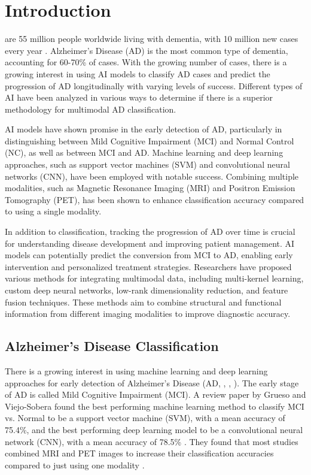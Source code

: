 \section{Introduction}
\label{sec:introduction}
 are 55 million people worldwide living with dementia, with 10 million new cases every year \cite{who_dementia_nodate}. Alzheimer's Disease (AD) is the most common type of dementia, accounting for 60-70\% of cases. With the growing number of cases, there is a growing interest in using AI models to classify AD cases and predict the progression of AD longitudinally with varying levels of success. Different types of AI have been analyzed in various ways to determine if there is a superior methodology for multimodal AD classification.

AI models have shown promise in the early detection of AD, particularly in distinguishing between Mild Cognitive Impairment (MCI) and Normal Control (NC), as well as between MCI and AD. Machine learning and deep learning approaches, such as support vector machines (SVM) and convolutional neural networks (CNN), have been employed with notable success. Combining multiple modalities, such as Magnetic Resonance Imaging (MRI) and Positron Emission Tomography (PET), has been shown to enhance classification accuracy compared to using a single modality.

In addition to classification, tracking the progression of AD over time is crucial for understanding disease development and improving patient management. AI models can potentially predict the conversion from MCI to AD, enabling early intervention and personalized treatment strategies. Researchers have proposed various methods for integrating multimodal data, including multi-kernel learning, custom deep neural networks, low-rank dimensionality reduction, and feature fusion techniques. These methods aim to combine structural and functional information from different imaging modalities to improve diagnostic accuracy.

\subsection{Alzheimer's Disease Classification}
There is a growing interest in using machine learning and deep learning approaches for early detection of Alzheimer's Disease (AD, \cite{lin_convolutional_2018}, \cite{grueso_machine_2021}, \cite{borchert_artificial_2021}). The early stage of AD is called Mild Cognitive Impairment (MCI). A review paper by Grueso and Viejo-Sobera found the best performing machine learning method to classify MCI vs. Normal to be a support vector machine (SVM), with a mean accuracy of 75.4\%, and the best performing deep learning model to be a convolutional neural network (CNN), with a mean accuracy of 78.5\% \cite{grueso_machine_2021}. They found that most studies combined MRI and PET images to increase their classification accuracies compared to just using one modality \cite{grueso_machine_2021}\cite{borchert_artificial_2021}. 


